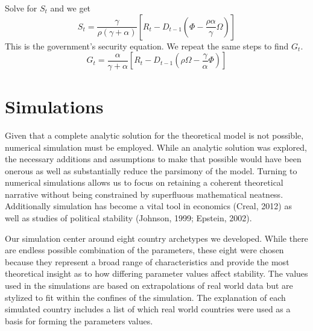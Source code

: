\documentclass[12pt]{article}
\begin{document}
\begin{spacing}{1.5}
\noindent Solve for $S_t$ and we get
\begin{equation}
S_t=\frac{\gamma }{ \rho(\gamma+\alpha)} \left[ R_t - D_{t-1} \left(\Phi - \frac{\rho \alpha}{\gamma} \Omega \right) \right]
\end{equation}
\noindent This is the government's security equation. We repeat the same steps to find $G_t$. 
\begin{equation}
G_t=\frac{\alpha}{\gamma  +\alpha} \left[ R_t - D_{t-1} \left(\rho \Omega - \frac{\gamma}{\alpha} \Phi \right) \right]
\end{equation}


\section{Simulations} 

Given that a complete analytic solution for the theoretical model is not possible, numerical simulation must be employed. While an analytic solution was explored, the necessary additions and assumptions to make that possible would have been onerous as well as substantially reduce the parsimony of the model. Turning to numerical simulations allows us to focus on retaining a coherent theoretical narrative without being constrained by superfluous mathematical neatness. Additionally simulation has become a vital tool in economics (Creal, 2012) as well as studies of political stability (Johnson, 1999; Epstein, 2002).  


Our simulation center around eight country archetypes we developed. While there are endless possible combination of the parameters, these eight were chosen because they represent a broad range of characteristics and provide the most theoretical insight as to how differing parameter values affect stability. The values used in the simulations are based on extrapolations of real world data but are stylized to fit within the confines of the simulation. The explanation of each simulated country includes a list of which real world countries were used as a basis for forming the parameters values. 


\end{spacing}
\end{document}
